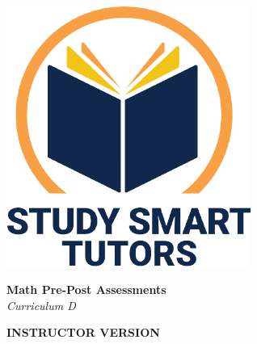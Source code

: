 \documentclass[12pt]{article}
\begin{document}
\newpage


\newpage





\newpage
\thispagestyle{empty}
\vspace*{\fill}

\vspace*{10cm}






\thispagestyle{empty}

\vspace*{\fill}

\vspace*{3cm}

\begin{center}

    \includegraphics[width=0.6\textwidth]{SST_Color_Logo.png} %
    
    \vspace{2cm} %
    

    
    \Huge \textbf{ Math Pre-Post Assessments}\\
    \LARGE \textit{Curriculum D}\\[1cm]
 \vspace{2cm}

    \Huge \textbf{INSTRUCTOR VERSION}
    
   
    
    \vfill %
    
\end{center}

\newpage
\thispagestyle{empty}
\end{document}

